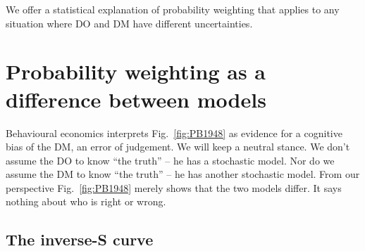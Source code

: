 \documentclass[a4paper, 12pt]{article}
\newcommand{\fref}[1]{Fig.~\ref{fig:#1}}
\newcommand{\seclabel}[1]{\label{sec:#1}}
\newcommand{\MK}[1]{\textcolor{red}{\textit{***MK: #1 MK***}}}
\begin{document}
We offer a statistical explanation of probability weighting that applies to any situation where DO and DM have different uncertainties.

%
% 
%



\section{Probability weighting as a difference between models} \seclabel{ModelDiff}
Behavioural economics interprets \fref{PB1948} as evidence for a cognitive bias of the DM, an error of judgement. We will keep a neutral stance. We don't assume the DO to know ``the truth'' -- he has a stochastic model. Nor do we assume the DM to know ``the truth'' -- he has another stochastic model. From our perspective \fref{PB1948} merely shows that the two models differ. It says nothing about who is right or wrong.

\subsection{The inverse-S curve\seclabel{The_inverse}}
\end{document}
